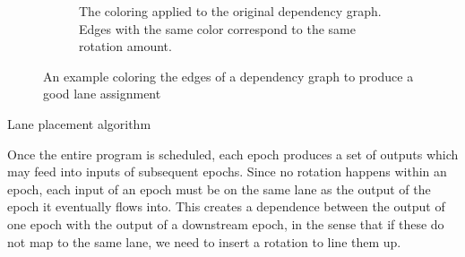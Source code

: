 \begin{figure}
\begin{subfigure}{0.24\textwidth}
        \caption{The coloring applied to the original dependency graph. Edges with the same color correspond to the same rotation amount.}\label{fig:colored-dependence-graph}
    \end{subfigure}
    \caption{An example coloring the edges of a dependency graph to produce a good lane assignment}\label{fig:lane-assignment}
\end{figure}

\begin{algorithm}



    \caption{Lane placement algorithm}\label{alg:lane-placement}
\end{algorithm}

Once the entire program is scheduled, each epoch produces a set of outputs which may feed into inputs of subsequent epochs.
Since no rotation happens within an epoch, each input of an epoch must be on the same lane as the output of the epoch it eventually flows into.
This creates a dependence between the output of one epoch with the output of a downstream epoch, in the sense that if these do not map to the same lane, we need to insert a rotation to line them up.

